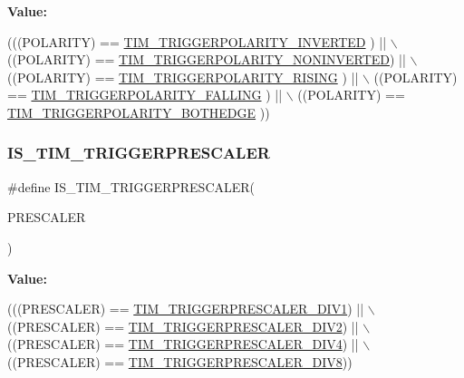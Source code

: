 {\bfseries Value\+:}
\begin{DoxyCode}
(((POLARITY) == \mbox{\hyperlink{group___t_i_m___trigger___polarity_ga64337379c3762dca395b812c65656de4}{TIM\_TRIGGERPOLARITY\_INVERTED}}   ) || \(\backslash\)
                                              ((POLARITY) == 
      \mbox{\hyperlink{group___t_i_m___trigger___polarity_gad985881cdfddb63dfc52e6aaca776ff6}{TIM\_TRIGGERPOLARITY\_NONINVERTED}}) || \(\backslash\)
                                              ((POLARITY) == 
      \mbox{\hyperlink{group___t_i_m___trigger___polarity_ga64b521aa367d745ec00a763449634ace}{TIM\_TRIGGERPOLARITY\_RISING}}     ) || \(\backslash\)
                                              ((POLARITY) == 
      \mbox{\hyperlink{group___t_i_m___trigger___polarity_ga77df5988527ca829743dd57d2f867972}{TIM\_TRIGGERPOLARITY\_FALLING}}    ) || \(\backslash\)
                                              ((POLARITY) == 
      \mbox{\hyperlink{group___t_i_m___trigger___polarity_gaa72eb9fd278575ff05aa3dd1c173dcc8}{TIM\_TRIGGERPOLARITY\_BOTHEDGE}}   ))
\end{DoxyCode}
\mbox{\label{group___t_i_m___i_s___t_i_m___definitions_ga5756eafba610ec82cad88317c194cb81}} 
\subsubsection{\texorpdfstring{I\+S\+\_\+\+T\+I\+M\+\_\+\+T\+R\+I\+G\+G\+E\+R\+P\+R\+E\+S\+C\+A\+L\+ER}{IS\_TIM\_TRIGGERPRESCALER}}
{\footnotesize\ttfamily \#define I\+S\+\_\+\+T\+I\+M\+\_\+\+T\+R\+I\+G\+G\+E\+R\+P\+R\+E\+S\+C\+A\+L\+ER(\begin{DoxyParamCaption}\item[{}]{P\+R\+E\+S\+C\+A\+L\+ER }\end{DoxyParamCaption})}

{\bfseries Value\+:}
\begin{DoxyCode}
(((PRESCALER) == \mbox{\hyperlink{group___t_i_m___trigger___prescaler_ga02ab6f24e367cd972a1e0c1df326a7a3}{TIM\_TRIGGERPRESCALER\_DIV1}}) || \(\backslash\)
                                             ((PRESCALER) == 
      \mbox{\hyperlink{group___t_i_m___trigger___prescaler_ga1350c5659a17a66df69b444871907d83}{TIM\_TRIGGERPRESCALER\_DIV2}}) || \(\backslash\)
                                             ((PRESCALER) == 
      \mbox{\hyperlink{group___t_i_m___trigger___prescaler_ga195dd56e15ea4733e19518fb431dfb8d}{TIM\_TRIGGERPRESCALER\_DIV4}}) || \(\backslash\)
                                             ((PRESCALER) == 
      \mbox{\hyperlink{group___t_i_m___trigger___prescaler_ga78edbcf4caf228de0daa4b7f698f578f}{TIM\_TRIGGERPRESCALER\_DIV8}}))
\end{DoxyCode}
